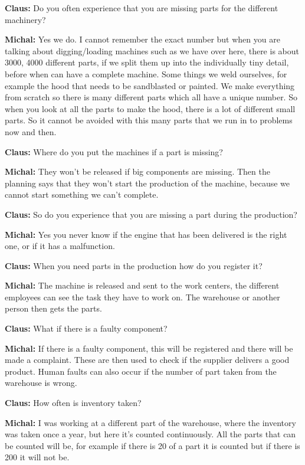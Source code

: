 
\textbf{Claus:} Do you often experience that you are missing parts for the
different machinery?\nl

\textbf{Michal:} Yes we do. I cannot remember the exact number but when you are
talking about digging/loading machines such as we have over here, there is about
3000, 4000 different parts, if we split them up into the individually tiny
detail, before when can have a complete machine. Some things we weld ourselves,
for example the hood that needs to be sandblasted or painted.  We make
everything from scratch so there is many different parts which all have a unique
number. So when you look at all the parts to make the hood, there is a lot of
different small parts. So it cannot be avoided with this many parts that we run
in to problems now and then.\nl

\textbf{Claus:} Where do you put the machines if a part is missing?\nl

\textbf{Michal:} They won’t be released if big components are missing. Then the
planning says that they won’t start the production of the machine, because we
cannot start something we can’t complete.\nl

\textbf{Claus:} So do you experience that you are missing a part during the
production?\nl

\textbf{Michal:} Yes you never know if the engine that has been delivered is the
right one, or if it has a malfunction.\nl

\textbf{Claus:} When you need parts in the production how do you register it?\nl

\textbf{Michal:} The machine is released and sent to the work centers, the
different employees can see the task they have to work on. The warehouse or
another person then gets the parts.\nl

\textbf{Claus:} What if there is a faulty component?\nl

\textbf{Michal:} If there is a faulty component, this will be registered and
there will be made a complaint. These are then used to check if the supplier
delivers a good product. Human faults can also occur if the number of part taken
from the warehouse is wrong.\nl

\textbf{Claus:} How often is inventory taken?\nl

\textbf{Michal:} I was working at a different part of the warehouse, where the
inventory was taken once a year, but here it’s counted continuously. All the
parts that can be counted will be, for example if there is 20 of a part it is
counted but if there is 200 it will not be.\nl

